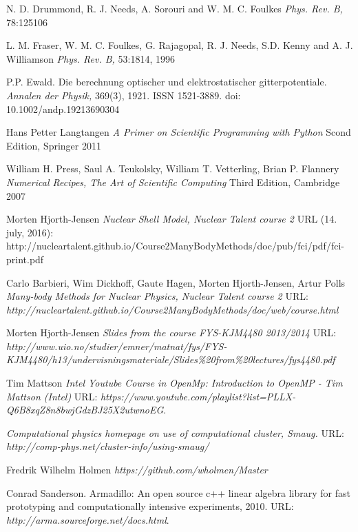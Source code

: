 \documentclass[twoside,english]{uiofysmaster}
\begin{document}
\begin{thebibliography}{9}
	N. D. Drummond, R. J. Needs, A. Sorouri and W. M. C. Foulkes
	\textit{Phys. Rev. B,} 78:125106

	L. M. Fraser, W. M. C. Foulkes, G. Rajagopal, R. J. Needs, S.D. Kenny and A. J. Williamson
	\textit{Phys. Rev. B,} 53:1814, 1996

	P.P. Ewald. Die berechnung optischer und elektrostatischer gitterpotentiale. 
	\textit{Annalen der Physik,} 369(3), 1921. ISSN 1521-3889. doi: 10.1002/andp.19213690304

	Hans Petter Langtangen
	\textit{A Primer on Scientific Programming with Python} Scond Edition, Springer 2011

	William H. Press, Saul A. Teukolsky, William T. Vetterling, Brian P. Flannery
	\textit{Numerical Recipes, The Art of Scientific Computing} Third Edition, Cambridge 2007

	Morten Hjorth-Jensen
	\textit{Nuclear Shell Model, Nuclear Talent course 2} 
	URL (14. july, 2016): http://nucleartalent.github.io/Course2ManyBodyMethods/doc/pub/fci/pdf/fci-print.pdf

	Carlo Barbieri, Wim Dickhoff, Gaute Hagen, Morten Hjorth-Jensen, Artur Polls
	\textit{Many-body Methods for Nuclear Physics, Nuclear Talent course 2} 
	URL: \textit{http://nucleartalent.github.io/Course2ManyBodyMethods/doc/web/course.html}

	Morten Hjorth-Jensen
	\textit{Slides from the course FYS-KJM4480 2013/2014}
	URL: \textit{http://www.uio.no/studier/emner/matnat/fys/FYS-KJM4480/h13/undervisningsmateriale/Slides\%20from\%20lectures/fys4480.pdf}

	Tim Mattson
	\textit{Intel Youtube Course in OpenMp: Introduction to OpenMP - Tim Mattson (Intel)}
	URL: \textit{https://www.youtube.com/playlist?list=PLLX-Q6B8xqZ8n8bwjGdzBJ25X2utwnoEG}.

	\textit{Computational physics homepage on use of computational cluster, Smaug.}
	URL: \textit{http://comp-phys.net/cluster-info/using-smaug/}

	Fredrik Wilhelm Holmen
	\textit{https://github.com/wholmen/Master} 

	Conrad Sanderson. Armadillo: An open source c++ linear algebra library for fast prototyping and computationally intensive experiments, 2010.
	URL: \textit{http://arma.sourceforge.net/docs.html}.

\end{thebibliography}
\end{document}
